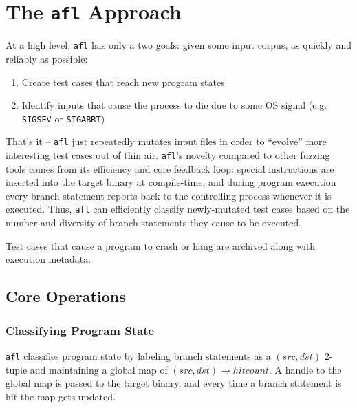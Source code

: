 \chapter{The \texttt{afl} Approach}


At a high level, \texttt{afl} has only a two goals: given some input corpus,
as quickly and reliably as possible:

\begin{enumerate}
    \item Create test cases that reach new program states
    \item Identify inputs that cause the process to die due to some
    OS signal (e.g. \texttt{SIGSEV} or \texttt{SIGABRT})
\end{enumerate}

That's it -- \texttt{afl} just repeatedly mutates input files in order to
``evolve'' more interesting test cases out of thin air.
\texttt{afl}'s novelty compared to other fuzzing tools comes from its
efficiency and core feedback loop: special instructions are inserted into the
target binary at compile-time, and during program execution every branch
statement reports back to the controlling process whenever it is executed.
Thus, \texttt{afl} can efficiently classify newly-mutated test cases based on
the number and diversity of branch statements they cause to be executed.

Test cases that cause a program to crash or hang are archived along with
execution metadata.

\section{Core Operations}





\subsection{Classifying Program State}

\texttt{afl} classifies program state by labeling branch statements
as a $(src, dst)$ 2-tuple and maintaining a global map of
$(src, dst) \rightarrow hitcount$. A handle to the global map is passed
to the target binary, and every time a branch statement is hit the map
gets updated.


